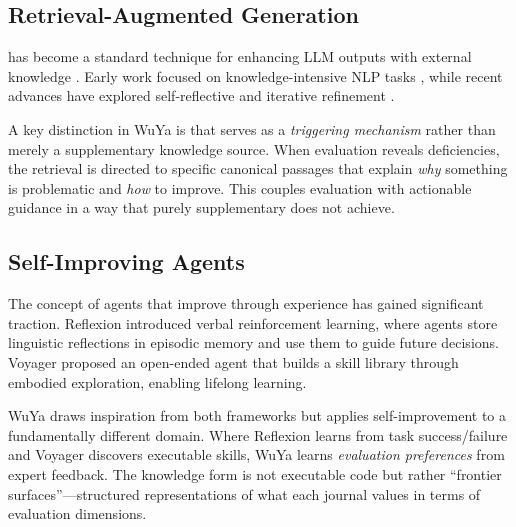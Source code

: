 \subsection{Retrieval-Augmented Generation}

\RAG{} has become a standard technique for enhancing LLM outputs with external knowledge \citep{lewis2020rag}. Early work focused on knowledge-intensive NLP tasks \citep{guu2020realm}, while recent advances have explored self-reflective \rag{} \citep{asai2024selfrag} and iterative refinement \citep{ram2023iterative}.

A key distinction in WuYa is that \rag{} serves as a \textit{triggering mechanism} rather than merely a supplementary knowledge source. When evaluation reveals deficiencies, the retrieval is directed to specific canonical passages that explain \textit{why} something is problematic and \textit{how} to improve. This couples evaluation with actionable guidance in a way that purely supplementary \rag{} does not achieve.

\subsection{Self-Improving Agents}

The concept of agents that improve through experience has gained significant traction. Reflexion \citep{shinn2023reflexion} introduced verbal reinforcement learning, where agents store linguistic reflections in episodic memory and use them to guide future decisions. Voyager \citep{wang2023voyager} proposed an open-ended agent that builds a skill library through embodied exploration, enabling lifelong learning.

WuYa draws inspiration from both frameworks but applies self-improvement to a fundamentally different domain. Where Reflexion learns from task success/failure and Voyager discovers executable skills, WuYa learns \textit{evaluation preferences} from expert feedback. The knowledge form is not executable code but rather ``frontier surfaces''---structured representations of what each journal values in terms of evaluation dimensions.

